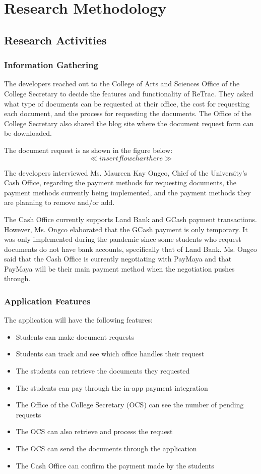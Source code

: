 \chapter{Research Methodology}

\section{Research Activities}

\subsection{Information Gathering}
The developers reached out to the College of Arts and Sciences Office of the College Secretary to decide the features and functionality of ReTrac. They asked what type of documents can be requested at their office, the cost for requesting each document, and the process for requesting the documents. The Office of the College Secretary also shared the blog site where the document request form can be downloaded.

The document request is as shown in the figure below:
$$ \ll insert flowchart here \gg $$

The developers interviewed Ms. Maureen Kay Ongco, Chief of the University's Cash Office, regarding the payment methods for requesting documents, the payment methods currently being implemented, and the payment methods they are planning to remove and/or add. 

The Cash Office currently supports Land Bank and GCash payment transactions. However, Ms. Ongco elaborated that the GCash payment is only temporary. It was only implemented during the pandemic since some students who request documents do not have bank accounts, specifically that of Land Bank. Ms. Ongco said that the Cash Office is currently negotiating with PayMaya and that PayMaya will be their main payment method when the negotiation pushes through.


\subsection{Application Features}
The application will have the following features:
\begin{itemize}
   \item Students can make document requests
   \item Students can track and see which office handles their request
   \item The students can retrieve the documents they requested
   \item The students can pay through the in-app payment integration
   \item The Office of the College Secretary (OCS) can see the number of pending requests
   \item The OCS can also retrieve and process the request
   \item The OCS can send the documents through the application
   \item The Cash Office can confirm the payment made by the students

\end{itemize}

